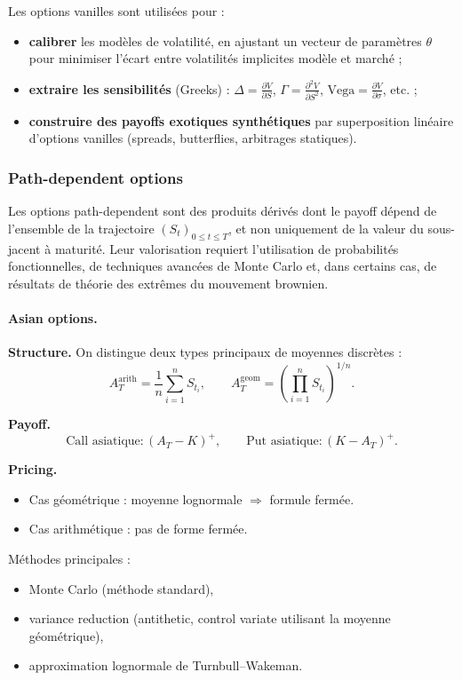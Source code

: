 \documentclass[11pt,a4paper]{article}
\newcommand{\1}{\mathbf{1}}
\begin{document}
Les options vanilles sont utilisées pour :
\begin{itemize}
  \item \textbf{calibrer} les modèles de volatilité, en ajustant un vecteur de paramètres $\theta$
  pour minimiser l'écart entre volatilités implicites modèle et marché ;
  \item \textbf{extraire les sensibilités} (Greeks) :
  $\Delta = \frac{\partial V}{\partial S}$,
  $\Gamma = \frac{\partial^2 V}{\partial S^2}$,
  $\text{Vega} = \frac{\partial V}{\partial \sigma}$, etc. ;
  \item \textbf{construire des payoffs exotiques synthétiques} par superposition linéaire
  d'options vanilles (spreads, butterflies, arbitrages statiques).
\end{itemize}


\subsubsection{Path-dependent options}

Les options path-dependent sont des produits dérivés dont le payoff dépend de
l'ensemble de la trajectoire $(S_t)_{0 \le t \le T}$, et non uniquement de la valeur
du sous-jacent à maturité. Leur valorisation requiert l'utilisation de probabilités
fonctionnelles, de techniques avancées de Monte Carlo et, dans certains cas, de
résultats de théorie des extrêmes du mouvement brownien.

\paragraph{Asian options.}

\textbf{Structure.}
On distingue deux types principaux de moyennes discrètes :
\[
A_T^{\mathrm{arith}} = \frac{1}{n}\sum_{i=1}^n S_{t_i},
\qquad
A_T^{\mathrm{geom}} = \left(\prod_{i=1}^n S_{t_i}\right)^{1/n}.
\]

\textbf{Payoff.}
\[
\text{Call asiatique}: (A_T - K)^+,
\qquad
\text{Put asiatique}: (K - A_T)^+.
\]

\textbf{Pricing.}
\begin{itemize}
  \item Cas géométrique : moyenne lognormale $\Rightarrow$ formule fermée.
  \item Cas arithmétique : pas de forme fermée.
\end{itemize}
Méthodes principales :
\begin{itemize}
  \item Monte Carlo (méthode standard),
  \item variance reduction (antithetic, control variate utilisant la moyenne géométrique),
  \item approximation lognormale de Turnbull--Wakeman.
\end{itemize}
\end{document}
